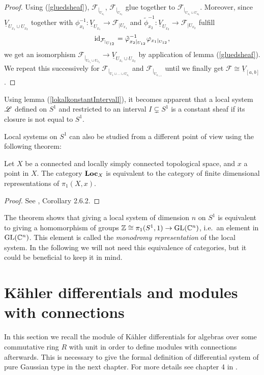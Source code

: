 \begin{proof}
Using (\ref{gluedsheaf}), $\mathcal{F}_{\vert_{U_{x_1}}}$,  $\mathcal{F}_{\vert_{U_{x_2}}}$ glue together to $\mathcal{F}_{\vert_{U_{x_1} \cup U_{x_2}}}$. Moreover, since $\underline{V}_{U_{x_1} \cup U_{x_2}}$ together with $\phi_{x_1}^{-1}: \underline{V}_{U_{x_1}} \to \mathcal{F}_{\vert U_{x_1}}$ and $\tilde{\phi}_{x_2}^{-1}: \underline{V}_{U_{x_2}} \to \mathcal{F}_{\vert U_{x_2}}$ fulfill 
\[
\operatorname{id}_{\mathcal{F}_{\vert_{U_{12}}}} = \tilde{\varphi}_{x_2\vert_{U_{12}}}^{-1}\varphi_{x_1\vert_{U_{12}}},
\]
we get an isomorphism $\mathcal{F}_{\vert_{U_{x_1} \cup U_{x_2}}} \to \underline{V}_{U_{x_1} \cup U_{x_2}}$ by application of lemma (\ref{gluedsheaf}). We repeat this successively for $\mathcal{F}_{\vert_{ U_1 \cup \dots \cup U_{x_i}}}$ and $\mathcal{F}_{\vert_{U_{x_{i+1}}}}$ until we finally get 
$\mathcal{F} \cong \underline{V}_{[a,b]}$.
\end{proof}

Using lemma (\ref{lokalkonstantIntervall}), it becomes apparent that a local system $\mathscr{L}$ defined on $S^1$ and restricted to an interval $I\subsetneq S^1$ is a constant sheaf if its closure is not equal to $S^1$.


\begin{rem}
    Local systems on $S^1$ can also be studied from a different point of view using the following theorem: 
\begin{thm}\label{monodromy}
Let $X$ be a connected and locally simply connected topological space, and $x$ a point in $X$. The category $\mathbf{Loc}_X$ is equivalent to the category of finite dimensional representations of $\pi_1(X,x)$.
\end{thm}
\begin{proof}
    See \cite{szamuely_2009}, Corollary 2.6.2.
\end{proof}
 The theorem shows that giving a local system of dimension $n$ on $S^1$ is equivalent to giving a homomorphism of groups $\mathbb{Z} \cong \pi_1(S^1,1) \to \operatorname{GL}(\mathbb{C}^n)$, i.e.\ an element in $\operatorname{GL}(\mathbb{C}^n)$. This element is called the \emph{monodromy representation} of the local system. In the following we will not need this equivalence of categories, but it could be beneficial to keep it in mind.
\end{rem}


\section{Kähler differentials and modules with connections}

In this section we recall the module of Kähler differentials for algebras over some commutative ring $R$ with unit in order to define modules with connections afterwards. This is necessary to give the formal definition of differential system of pure Gaussian type in the next chapter. For more details see chapter 4 in \cite{LinAlg}. 

